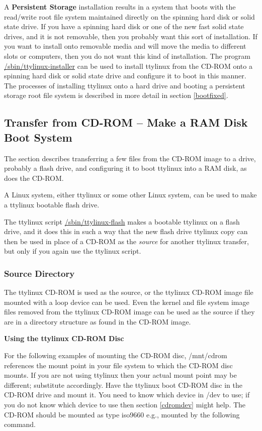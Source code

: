 \documentclass[10pt]{article}
\begin{document}
A {\bf Persistent Storage} installation results in a system that boots with the
read/write root file system maintained directly on the spinning hard disk or
solid state drive. If you have a spinning hard disk or one of the new fast
solid state drives, and it is not removable, then you probably want this sort
of installation. If you want to install onto removable media and will move the
media to different slots or computers, then you do not want this kind of
installation. The program \url{/sbin/ttylinux-installer} can be used to install
ttylinux from the CD-ROM onto a spinning hard disk or solid state drive and
configure it to boot in this manner. The processes of installing ttylinux onto
a hard drive and booting a persistent storage root file system is described in
more detail in section \ref{bootfixed}.

\subsection{Transfer from CD-ROM -- Make a RAM Disk Boot System}
\label{bootflash}

The section describes transferring a few files from the CD-ROM image to a drive,
probably a flash drive, and configuring it to boot ttylinux into a RAM disk, as
does the CD-ROM.

A Linux system, either ttylinux or some other Linux system, can be used to make
a ttylinux bootable flash drive.

The ttylinux script \url{/sbin/ttylinux-flash} makes a bootable ttylinux on a
flash drive, and it does this in such a way that the new flash drive ttylinux
copy can then be used in place of a CD-ROM as the {\it source} for another
ttylinux transfer, but only if you again use the ttylinux script.

\subsubsection{Source Directory}

The ttylinux CD-ROM is used as the source, or the ttylinux CD-ROM image file
mounted with a loop device can be used. Even the kernel and file system image
files removed from the ttylinux CD-ROM image can be used as the source if they
are in a directory structure as found in the CD-ROM image.

{\bf Using the ttylinux CD-ROM Disc}

For the following examples of mounting the CD-ROM disc, /mnt/cdrom references
the mount point in your file system to which the CD-ROM disc mounts. If you are
not using ttylinux then your actual mount point may be different; substitute
accordingly. Have the ttylinux boot CD-ROM disc in the CD-ROM drive and mount
it. You need to know which device in /dev to use; if you do not know which
device to use then section \ref{cdromdev} might help. The CD-ROM should be
mounted as type iso9660 e.g., mounted by the following command.
\end{document}
